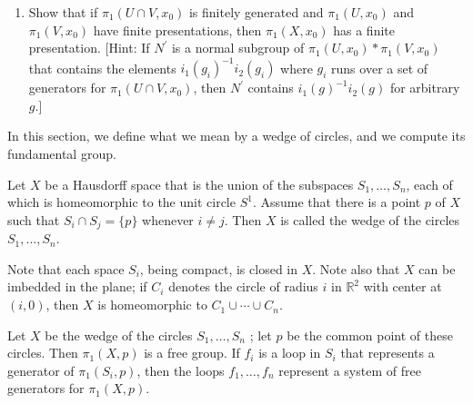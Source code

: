 \begin{enumerate}[itemsep=0.4em, parsep=0pt, topsep=0pt, partopsep=0pt, leftmargin=*, label=\arabic*., ref=\arabic*]
\begin{enumerate}[itemsep=0.2em, parsep=0pt, topsep=0pt, partopsep=0pt, leftmargin=*, label=(\alph*), align=left]
 \item Show that if \({\pi }_{1}( {U \cap V,x_{0}})\) is finitely generated and \({\pi }_{1}( {U,x_{0}})\) and \({\pi }_{1}( {V,x_{0}})\) have finite presentations, then \({\pi }_{1}( {X,x_{0}})\) has a finite presentation. [Hint: If \(N^{\prime }\) is a normal subgroup of \({\pi }_{1}( {U,x_{0}}) * {\pi }_{1}( {V,x_{0}})\) that contains the elements \(i_{1}{( g_{i}) }^{-1}i_{2}( g_{i})\) where \(g_{i}\) runs over a set of generators for \({\pi }_{1}( {U \cap V,x_{0}})\), then \(N^{\prime }\) contains \(i_{1}{( g) }^{-1}i_{2}( g)\) for arbitrary \(g\).]
 \end{enumerate}
\end{enumerate}

In this section, we define what we mean by a wedge of circles, and we compute its fundamental group.

\begin{definition}
Let \(X\) be a Hausdorff space that is the union of the subspaces \(S_{1},\ldots ,S_{n}\), each of which is homeomorphic to the unit circle \(S^{1}\). Assume that there is a point \(p\) of \(X\) such that \(S_{i} \cap {S}_{j} = \{ p\}\) whenever \(i \neq j\). Then \(X\) is called the wedge of the circles \(S_{1},\ldots ,S_{n}\).
\end{definition}

Note that each space \(S_{i}\), being compact, is closed in \(X\). Note also that \(X\) can be imbedded in the plane; if \(C_{i}\) denotes the circle of radius \(i\) in \(\mathbb{R}^{2}\) with center at \(( {i,0})\), then \(X\) is homeomorphic to \(C_{1} \cup \cdots \cup {C}_{n}\).

\begin{theorem}
\label{thm:\thetheorem}
Let \(X\) be the wedge of the circles \(S_{1},\ldots ,S_{n}\) ; let \(p\) be the common point of these circles. Then \({\pi }_{1}( {X,p})\) is a free group. If \(f_{i}\) is a loop in \(S_{i}\) that represents a generator of \({\pi }_{1}( {S_{i},p})\), then the loops \(f_{1},\ldots ,f_{n}\) represent a system of free generators for \({\pi }_{1}( {X,p})\).
\end{theorem}

